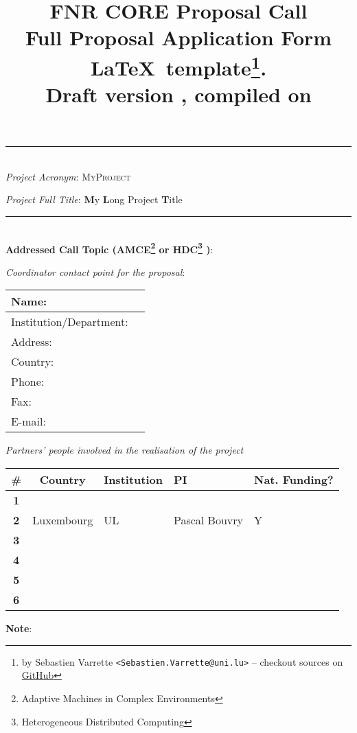 \documentclass[11pt,twoside,a4paper]{article}
\title{\textbf{\Large FNR CORE Proposal Call} \\[1em]
  {\small Full Proposal Application Form \LaTeX\ template\thanks{by Sebastien
      Varrette {\small \texttt{<Sebastien.Varrette@uni.lu>}} -- checkout sources
      on \href{https://github.com/Falkor/fnr-latex-template}{GitHub}}.\\
    \textbf{Draft version \docversion}, compiled on \isodayandtime}
}
\author{}
\date{}
\newcommand{\project}{\textsc{MyProject}\xspace}
\newcommand{\fulltitle}{\textbf{M}y \textbf{L}ong \textsc{P}roject \textbf{T}itle\xspace}
\begin{document}
\maketitle
{\Large
  \begin{center}
      \hrule
      ~\\
      \emph{Project Acronym}: \project

      \emph{Project Full Title}: \fulltitle\\[1em]
  \end{center}
}
\hrule
~\\[2em]
\textbf{Addressed Call Topic (AMCE\footnote{Adaptive Machines in Complex Environments}  or HDC\footnote{Heterogeneous Distributed Computing} )}: 

\emph{Coordinator contact point for the proposal}:

\begin{table}[H]
    \centering\small
    \begin{tabular}{|p{}|p{}|}
        \hline
        Name:                   & \\\hline
        Institution/Department: & \\\hline
        Address:                & \\\hline
        Country:                & \\\hline
        Phone:                  & \\\hline
        Fax:                    & \\\hline
        E-mail:                 & \\\hline
        \hline
    \end{tabular}
\end{table}

\emph{Partners' people involved in the realisation of the project }

\begin{table}[H]
    \centering\small
    \begin{tabular}{|c|c|p{}|p{}|p{}|}
        \hline
        \rowcolor{lightgray}
        \textbf{\#} & \textbf{Country} & \textbf{Institution} & \textbf{PI} & \textbf{Nat. Funding?}\\\hline
        \hline 
        \textbf{1}  & & & &\\\hline
        \textbf{2}  & Luxembourg & \acf{UL} & Pascal Bouvry & Y \\\hline
        \textbf{3}  & & & &\\\hline
        \textbf{4}  & & & &\\\hline
        \textbf{5}  & & & &\\\hline
        \textbf{6}  & & & &\\\hline
        \hline
    \end{tabular}
\end{table}
\textbf{Note}:
\end{document}
